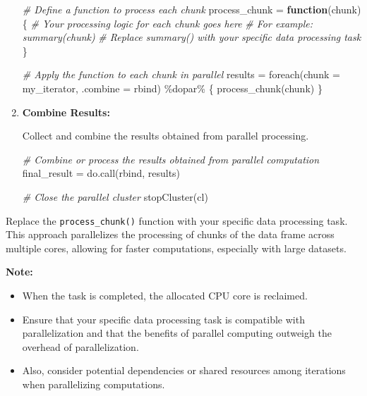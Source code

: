 \documentclass[
]{article}
\newenvironment{Shaded}{}{}
\newcommand{\AttributeTok}[1]{\textcolor[rgb]{0.49,0.56,0.16}{#1}}
\newcommand{\CommentTok}[1]{\textcolor[rgb]{0.38,0.63,0.69}{\textit{#1}}}
\newcommand{\ControlFlowTok}[1]{\textcolor[rgb]{0.00,0.44,0.13}{\textbf{#1}}}
\newcommand{\FunctionTok}[1]{\textcolor[rgb]{0.02,0.16,0.49}{#1}}
\newcommand{\NormalTok}[1]{#1}
\newcommand{\OtherTok}[1]{\textcolor[rgb]{0.00,0.44,0.13}{#1}}
\newcommand{\SpecialCharTok}[1]{\textcolor[rgb]{0.25,0.44,0.63}{#1}}
\begin{document}
\begin{enumerate}
\begin{Shaded}
\begin{Highlighting}[]
 \CommentTok{\# Define a function to process each chunk}
\NormalTok{ process\_chunk }\OtherTok{=} \ControlFlowTok{function}\NormalTok{(chunk) \{}
   \CommentTok{\# Your processing logic for each chunk goes here}
   \CommentTok{\# For example: summary(chunk)}
   \CommentTok{\# Replace summary() with your specific data processing task}
\NormalTok{ \}}

 \CommentTok{\# Apply the function to each chunk in parallel}
\NormalTok{ results }\OtherTok{=} \FunctionTok{foreach}\NormalTok{(}\AttributeTok{chunk =}\NormalTok{ my\_iterator, }\AttributeTok{.combine =}\NormalTok{ rbind) }\SpecialCharTok{\%dopar\%}\NormalTok{ \{}
   \FunctionTok{process\_chunk}\NormalTok{(chunk)}
\NormalTok{ \}}
\end{Highlighting}
\end{Shaded}
\item
  \textbf{Combine Results:}

  Collect and combine the results obtained from parallel processing.

\begin{Shaded}
\begin{Highlighting}[]
 \CommentTok{\# Combine or process the results obtained from parallel computation}
\NormalTok{ final\_result }\OtherTok{=} \FunctionTok{do.call}\NormalTok{(rbind, results)}

 \CommentTok{\# Close the parallel cluster}
 \FunctionTok{stopCluster}\NormalTok{(cl)}
\end{Highlighting}
\end{Shaded}
\end{enumerate}

Replace the \texttt{process\_chunk()} function with your specific data
processing task. This approach parallelizes the processing of chunks of
the data frame across multiple cores, allowing for faster computations,
especially with large datasets.

\textbf{Note:}

\begin{itemize}
\item
  When the task is completed, the allocated CPU core is reclaimed.
\item
  Ensure that your specific data processing task is compatible with
  parallelization and that the benefits of parallel computing outweigh
  the overhead of parallelization.
\item
  Also, consider potential dependencies or shared resources among
  iterations when parallelizing computations.
\end{itemize}
\end{document}
